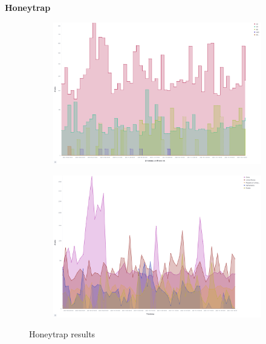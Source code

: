 \textbf{Honeytrap}

\begin{figure}
    \centering

    \begin{subfigure}[b]{0.49\textwidth}
        \centering
        \includegraphics[width=\textwidth]{figures/tpot-cowire-attacks.png}
        \caption{}
        \label{fig:tpot-honeytrap-attacks}
    \end{subfigure}
    \hfill
    \begin{subfigure}[b]{0.49\textwidth}
        \centering
        \includegraphics[width=\textwidth]{figures/tpot-cowire-country.png}
        \caption{}
        \label{fig:tpot-honeytrap-country}
    \end{subfigure}
    \caption[Honeytrap results]{Honeytrap results}
    \label{fig:honeytrap-results}
\end{figure}

